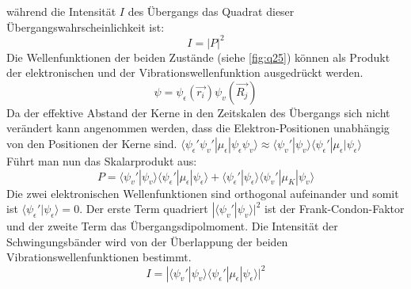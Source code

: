 während die Intensität $I$ des Übergangs das Quadrat dieser Übergangswahrscheinlichkeit ist: 
\begin{equation}
    I = |P|^2
\end{equation}
Die Wellenfunktionen der beiden Zustände (siehe \autoref{fig:q25}) können als Produkt der elektronischen und der Vibrationswellenfunktion ausgedrückt werden.
\begin{equation}
    \psi = \psi_{\epsilon}(\vec{r_i}) \psi_v(\vec{R_j})
\end{equation} 
Da der effektive Abstand der Kerne in den Zeitskalen des Übergangs sich nicht verändert kann angenommen werden, dass die Elektron-Positionen unabhängig von den Positionen der Kerne sind.
$\langle \psi_{\epsilon}' \psi_v' | \mu_{\epsilon}| \psi_{\epsilon} \psi_v\rangle  \approx  \langle\psi_v' |\psi_v \rangle \langle\psi_{\epsilon}'|\mu_{\epsilon}| \psi_{\epsilon} \rangle $ \\
Führt man nun das Skalarprodukt aus:
\begin{equation}
    P = \langle \psi_v' | \psi_v \rangle \langle \psi_{\epsilon}' | \mu_{\epsilon} | \psi_{\epsilon} \rangle + \langle \psi_{\epsilon}' | \psi_{\epsilon} \rangle \langle\psi_v' | \mu_K |\psi_v \rangle
\end{equation}
Die zwei elektronischen Wellenfunktionen sind orthogonal aufeinander und somit ist $\langle \psi_{\epsilon}' | \psi_{\epsilon} \rangle  = 0$.
Der erste Term quadriert $|\langle \psi_v' | \psi_v \rangle|^2$ ist der Frank-Condon-Faktor und der zweite Term das Übergangsdipolmoment. 
Die Intensität der Schwingungsbänder wird von der Überlappung der beiden Vibrationswellenfunktionen bestimmt.
\begin{equation}
    I = |\langle \psi_v' | \psi_v \rangle \langle \psi_{\epsilon}' | \mu_{\epsilon} | \psi_{\epsilon} \rangle|^2
\end{equation}


\label{q:26}

